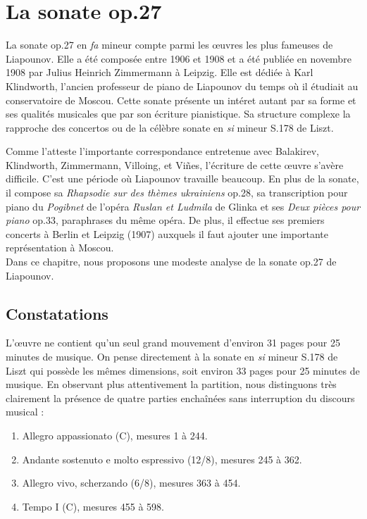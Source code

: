 
\chapter{La sonate op.27}

La sonate op.27 en \emph{fa} mineur compte parmi les œuvres les plus fameuses de Liapounov. Elle a été composée entre 1906 et 1908 et a été publiée en novembre 1908 par Julius Heinrich Zimmermann à Leipzig. Elle est dédiée à Karl Klindworth, l'ancien professeur de piano de Liapounov du temps où il étudiait au conservatoire de Moscou. Cette sonate présente un intéret autant par sa forme et ses qualités musicales que par son écriture pianistique. Sa structure complexe la rapproche des concertos ou de la célèbre sonate en \emph{si} mineur S.178 de Liszt.

Comme l'atteste l'importante correspondance entretenue avec Balakirev, Klindworth, Zimmermann, Villoing, et Viñes, l'écriture de cette œuvre s'avère difficile. C'est une période où Liapounov travaille beaucoup. En plus de la sonate, il compose sa \emph{Rhapsodie sur des thèmes ukrainiens} op.28, sa transcription pour piano du \emph{Pogibnet} de l'opéra \emph{Ruslan et Ludmila} de Glinka et ses \emph{Deux pièces pour piano} op.33, paraphrases du même opéra. De plus, il effectue ses premiers concerts à Berlin et Leipzig (1907) auxquels il faut ajouter une importante représentation à Moscou.\\

Dans ce chapitre, nous proposons une modeste analyse de la sonate op.27 de Liapounov.

\section{Constatations}

L'œuvre ne contient qu'un seul grand mouvement d'environ 31 pages pour 25 minutes de musique. On pense directement à la sonate en \emph{si} mineur S.178 de Liszt qui possède les mêmes dimensions, soit environ 33 pages pour 25 minutes de musique. En observant plus attentivement la partition, nous distinguons très clairement la présence de quatre parties enchaînées sans interruption du discours musical :
\begin{enumerate}
  \item Allegro appassionato (C), mesures 1 à 244.
  \item Andante sostenuto e molto espressivo (12/8), mesures 245 à 362.
  \item Allegro vivo, scherzando (6/8), mesures 363 à 454.
  \item Tempo I (C), mesures 455 à 598.\\
\end{enumerate}

